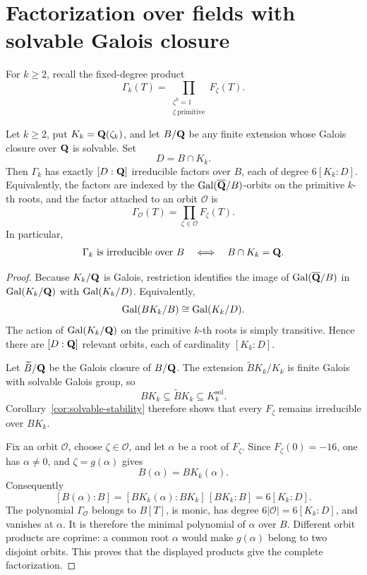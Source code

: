 \section{Factorization over fields with solvable Galois closure}
\label{sec:solvable-factorization}

For $k\ge2$, recall the fixed-degree product
\begin{equation}
 \Gamma_k(T)=
 \prod_{\substack{\zeta^k=1\\ \zeta\ \mathrm{primitive}}}F_\zeta(T).
 \label{eq:Gamma-fiber-product}
\end{equation}

\begin{theorem}
\label{thm:solvable-factorization}
Let $k\ge2$, put $K_k=\mathbf Q(\zeta_k)$, and let $B/\mathbf Q$ be any finite
extension whose Galois closure over $\mathbf Q$ is solvable.  Set
\[
 D=B\cap K_k.
\]
Then $\Gamma_k$ has exactly $[D:\mathbf Q]$ irreducible factors over $B$,
each of degree $6[K_k:D]$.  Equivalently, the factors are indexed by
the $\operatorname{Gal}(\overline{\mathbf Q}/B)$-orbits on the primitive $k$-th roots, and
the factor attached to an orbit $\mathcal O$ is
\[
 \Gamma_{\mathcal O}(T)=\prod_{\zeta\in\mathcal O}F_\zeta(T).
\]
In particular,
\[
 \Gamma_k\text{ is irreducible over }B
 \quad\Longleftrightarrow\quad B\cap K_k=\mathbf Q.
\]
\end{theorem}

\begin{proof}
Because $K_k/\mathbf Q$ is Galois, restriction identifies the image of
$\operatorname{Gal}(\overline{\mathbf Q}/B)$ in $\operatorname{Gal}(K_k/\mathbf Q)$ with
$\operatorname{Gal}(K_k/D)$.  Equivalently,
\[
 \operatorname{Gal}(BK_k/B)\cong\operatorname{Gal}(K_k/D).
\]
The action of $\operatorname{Gal}(K_k/\mathbf Q)$ on the primitive $k$-th roots is simply
transitive.  Hence there are $[D:\mathbf Q]$ relevant orbits, each of
cardinality $[K_k:D]$.

Let $\widetilde B/\mathbf Q$ be the Galois closure of $B/\mathbf Q$.  The extension
$\widetilde B K_k/K_k$ is finite Galois with solvable Galois group, so
\[
 BK_k\subseteq\widetilde B K_k\subseteq K_k^{\mathrm{sol}}.
\]
Corollary~\ref{cor:solvable-stability} therefore shows that every
$F_\zeta$ remains irreducible over $BK_k$.

Fix an orbit $\mathcal O$, choose $\zeta\in\mathcal O$, and let
$\alpha$ be a root of $F_\zeta$.  Since $F_\zeta(0)=-16$, one has
$\alpha\ne0$, and $\zeta=g(\alpha)$ gives
\[
 B(\alpha)=BK_k(\alpha).
\]
Consequently
\[
 [B(\alpha):B]
 =[BK_k(\alpha):BK_k]\,[BK_k:B]
 =6[K_k:D].
\]
The polynomial $\Gamma_{\mathcal O}$ belongs to $B[T]$, is monic,
has degree $6|\mathcal O|=6[K_k:D]$, and vanishes at $\alpha$.  It is
therefore the minimal polynomial of $\alpha$ over $B$.
Different orbit products are coprime: a common root $\alpha$ would
make $g(\alpha)$ belong to two disjoint orbits.  This proves that the
displayed products give the complete factorization.
\end{proof}

